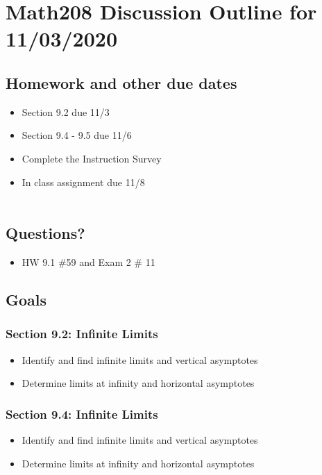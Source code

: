 \documentclass[14pt]{extarticle}
\begin{document}
\section*{Math208 Discussion Outline for 11/03/2020}

\subsection{Homework and other due dates}
\begin{itemize}
\item Section 9.2 due 11/3
\item Section 9.4 - 9.5 due 11/6
\item Complete the Instruction Survey
\item In class assignment due 11/8 \\\\
\end{itemize}

\subsection{Questions?}
\begin{itemize}
	\item HW 9.1 \#59 and Exam 2 \# 11
\end{itemize}

\subsection{Goals}
\subsubsection*{Section 9.2: Infinite Limits}
\begin{itemize}
	\item Identify and find infinite limits and vertical asymptotes
	\item Determine limits at infinity and horizontal asymptotes
\end{itemize}
\subsubsection*{Section 9.4: Infinite Limits}
\begin{itemize}
	\item Identify and find infinite limits and vertical asymptotes
	\item Determine limits at infinity and horizontal asymptotes
\end{itemize}
\end{document}
